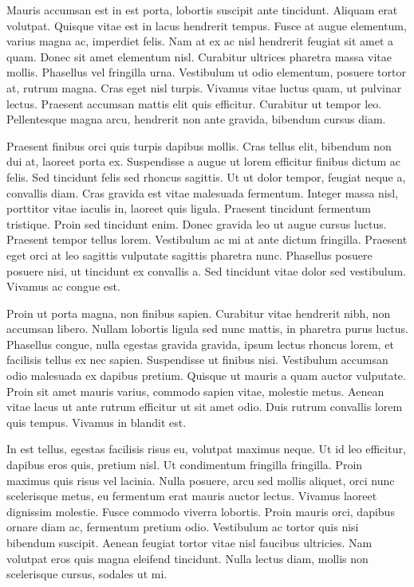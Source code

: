Mauris accumsan est in est porta, lobortis suscipit ante tincidunt. Aliquam erat volutpat. Quisque vitae est in lacus hendrerit tempus. Fusce at augue elementum, varius magna ac, imperdiet felis. Nam at ex ac nisl hendrerit feugiat sit amet a quam. Donec sit amet elementum nisl. Curabitur ultrices pharetra massa vitae mollis. Phasellus vel fringilla urna. Vestibulum ut odio elementum, posuere tortor at, rutrum magna. Cras eget nisl turpis. Vivamus vitae luctus quam, ut pulvinar lectus. Praesent accumsan mattis elit quis efficitur. Curabitur ut tempor leo. Pellentesque magna arcu, hendrerit non ante gravida, bibendum cursus diam.

Praesent finibus orci quis turpis dapibus mollis. Cras tellus elit, bibendum non dui at, laoreet porta ex. Suspendisse a augue ut lorem efficitur finibus dictum ac felis. Sed tincidunt felis sed rhoncus sagittis. Ut ut dolor tempor, feugiat neque a, convallis diam. Cras gravida est vitae malesuada fermentum. Integer massa nisl, porttitor vitae iaculis in, laoreet quis ligula. Praesent tincidunt fermentum tristique. Proin sed tincidunt enim. Donec gravida leo ut augue cursus luctus. Praesent tempor tellus lorem. Vestibulum ac mi at ante dictum fringilla. Praesent eget orci at leo sagittis vulputate sagittis pharetra nunc. Phasellus posuere posuere nisi, ut tincidunt ex convallis a. Sed tincidunt vitae dolor sed vestibulum. Vivamus ac congue est.

Proin ut porta magna, non finibus sapien. Curabitur vitae hendrerit nibh, non accumsan libero. Nullam lobortis ligula sed nunc mattis, in pharetra purus luctus. Phasellus congue, nulla egestas gravida gravida, ipsum lectus rhoncus lorem, et facilisis tellus ex nec sapien. Suspendisse ut finibus nisi. Vestibulum accumsan odio malesuada ex dapibus pretium. Quisque ut mauris a quam auctor vulputate. Proin sit amet mauris varius, commodo sapien vitae, molestie metus. Aenean vitae lacus ut ante rutrum efficitur ut sit amet odio. Duis rutrum convallis lorem quis tempus. Vivamus in blandit est.

In est tellus, egestas facilisis risus eu, volutpat maximus neque. Ut id leo efficitur, dapibus eros quis, pretium nisl. Ut condimentum fringilla fringilla. Proin maximus quis risus vel lacinia. Nulla posuere, arcu sed mollis aliquet, orci nunc scelerisque metus, eu fermentum erat mauris auctor lectus. Vivamus laoreet dignissim molestie. Fusce commodo viverra lobortis. Proin mauris orci, dapibus ornare diam ac, fermentum pretium odio. Vestibulum ac tortor quis nisi bibendum suscipit. Aenean feugiat tortor vitae nisl faucibus ultricies. Nam volutpat eros quis magna eleifend tincidunt. Nulla lectus diam, mollis non scelerisque cursus, sodales ut mi.

